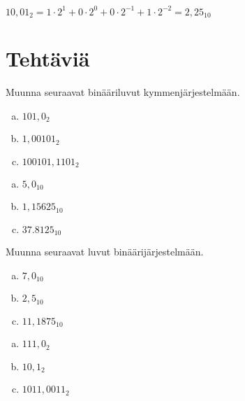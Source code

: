 \begin{esimerkki}
$10,01_2 = 1 \cdot 2^1 + 0 \cdot 2^0 + 0 \cdot 2^{-1} + 1 \cdot 2^{-2} = 2,25_{10}$
\end{esimerkki}

\section*{Tehtäviä}

\begin{tehtava}
Muunna seuraavat binääriluvut kymmenjärjestelmään.
	\begin{enumerate}[a)]
		\item $101,0_2$
		\item $1,00101_2$
		\item $100101,1101_2$
	\end{enumerate}
\begin{vastaus}
	\begin{enumerate}[a)]
		\item $5,0_{10}$
		\item $1,15625_{10}$
		\item $37.8125_{10}$
	\end{enumerate}
\end{vastaus}
\end{tehtava}

\begin{tehtava}
Muunna seuraavat luvut binäärijärjestelmään.
	\begin{enumerate}[a)]
		\item $7,0_{10}$
		\item $2,5_{10}$
		\item $11,1875_{10}$
	\end{enumerate}
\begin{vastaus}
	\begin{enumerate}[a)]
		\item $111,0_2$
		\item $10,1_2$
		\item $1011,0011_2$
	\end{enumerate}
\end{vastaus}
\end{tehtava}

